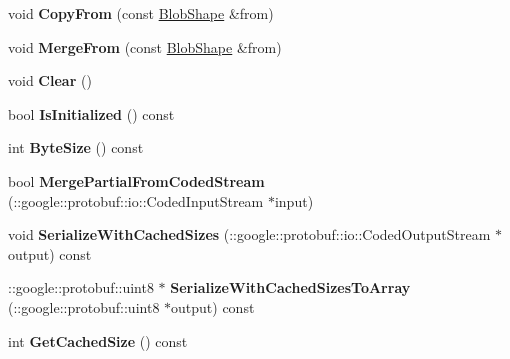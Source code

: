 \begin{DoxyCompactItemize}
\item 
\mbox{\label{classcaffe_1_1_blob_shape_a6723661521f09ff1588fb869979fcfc4}} 
void {\bfseries Copy\+From} (const \mbox{\hyperlink{classcaffe_1_1_blob_shape}{Blob\+Shape}} \&from)
\item 
\mbox{\label{classcaffe_1_1_blob_shape_a047a526573f397cf0744906f1ac1b670}} 
void {\bfseries Merge\+From} (const \mbox{\hyperlink{classcaffe_1_1_blob_shape}{Blob\+Shape}} \&from)
\item 
\mbox{\label{classcaffe_1_1_blob_shape_a698cb0924590158d4532f7559bf3ddb0}} 
void {\bfseries Clear} ()
\item 
\mbox{\label{classcaffe_1_1_blob_shape_a39fd41bd4405053d986feef855fdd2ee}} 
bool {\bfseries Is\+Initialized} () const
\item 
\mbox{\label{classcaffe_1_1_blob_shape_a775d5dd961cc5ea98c7ea13c117d773b}} 
int {\bfseries Byte\+Size} () const
\item 
\mbox{\label{classcaffe_1_1_blob_shape_a8ee8fc37cfa38572ea02be406a036208}} 
bool {\bfseries Merge\+Partial\+From\+Coded\+Stream} (\+::google\+::protobuf\+::io\+::\+Coded\+Input\+Stream $\ast$input)
\item 
\mbox{\label{classcaffe_1_1_blob_shape_aca128fc7b7e13e181f145ec1b56c6165}} 
void {\bfseries Serialize\+With\+Cached\+Sizes} (\+::google\+::protobuf\+::io\+::\+Coded\+Output\+Stream $\ast$output) const
\item 
\mbox{\label{classcaffe_1_1_blob_shape_a3ba6574450bb4a37dde9341330d7bce5}} 
\+::google\+::protobuf\+::uint8 $\ast$ {\bfseries Serialize\+With\+Cached\+Sizes\+To\+Array} (\+::google\+::protobuf\+::uint8 $\ast$output) const
\item 
\mbox{\label{classcaffe_1_1_blob_shape_ad9f41fbb4f768211fd1f06491161ef2c}} 
int {\bfseries Get\+Cached\+Size} () const
\item 
\mbox{\label{classcaffe_1_1_blob_shape_a2a6a7901e99defa693e8fce966202411}} 

\end{DoxyCompactItemize}
